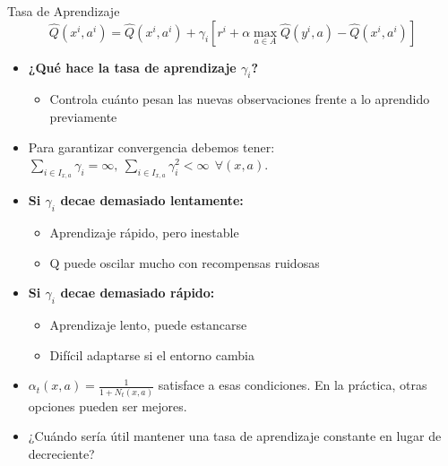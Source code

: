 \documentclass[handout]{beamer}
\begin{document}
\begin{frame}{Tasa de Aprendizaje}
$$
\hat Q(x^i,a^i) = \hat Q(x^i,a^i) + \gamma_i\left[ r^i +\alpha \max\limits_{a \in A}\hat Q(y^i,a)-\hat Q(x^i,a^i)\right]
$$
\begin{itemize}
\item<2-> \textbf{¿Qué hace la tasa de aprendizaje $\gamma_i$?}
\begin{itemize}
  \item Controla cuánto pesan las nuevas observaciones frente a lo aprendido previamente
\end{itemize}
\item<3-> Para garantizar convergencia debemos tener: $
\sum_{i \in I_{x,a}} \gamma_i = \infty, ~\sum_{i \in I_{x,a}} \gamma_i^2  <\infty~~\forall (x,a).
$
\item<4-> \textbf{Si $\gamma_i$ decae demasiado lentamente:}
\begin{itemize}
  \item Aprendizaje rápido, pero inestable
  \item Q puede oscilar mucho con recompensas ruidosas
\end{itemize}
\item<5-> \textbf{Si $\gamma_i$ decae demasiado rápido:}
\begin{itemize}
  \item Aprendizaje lento, puede estancarse
  \item Difícil adaptarse si el entorno cambia
\end{itemize}
\item<6-> $\alpha_t(x,a) = \frac{1}{1 + N_t(x,a)}$ satisface a esas condiciones. En la práctica, otras opciones pueden ser mejores.
\item<7-> ¿Cuándo sería útil mantener una tasa de aprendizaje constante en lugar de decreciente?
\end{itemize}

\end{frame}
\end{document}
